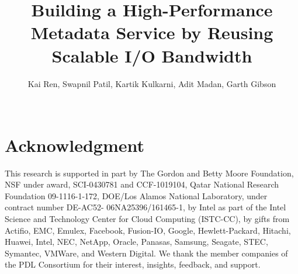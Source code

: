 \documentclass[conference]{acm_proc}
\begin{document}
\date{}

\title{Building a High-Performance Metadata Service by Reusing Scalable I/O Bandwidth}


\author{
\alignauthor
Kai Ren, Swapnil Patil, Kartik Kulkarni, Adit Madan, Garth Gibson \\
\\
}

\maketitle

\begin{abstract}

\end{abstract}





\section*{Acknowledgment}
This research is supported in part by The Gordon and Betty Moore Foundation, NSF under award, SCI-0430781 and
CCF-1019104, Qatar National Research Foundation 09-1116-1-172, DOE/Los Alamos National Laboratory, under contract number DE-AC52-
06NA25396/161465-1, by Intel as part of the Intel Science and Technology Center for Cloud Computing (ISTC-CC), by gifts from
Actifio, EMC, Emulex, Facebook, Fusion-IO, Google, Hewlett-Packard, Hitachi, Huawei, Intel,
NEC, NetApp, Oracle, Panasas, Samsung, Seagate, STEC, Symantec, VMWare, and Western Digital.
We thank the member companies of the PDL Consortium for their interest, insights, feedback, and support.



\end{document}

